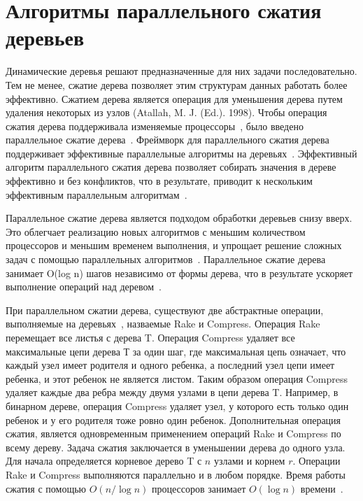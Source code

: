\documentclass[specification,annotation]{itmo-student-thesis}
\begin{document}
\section{Алгоритмы параллельного сжатия деревьев}\label{survey-contraction}

Динамические деревья решают предназначенные для них задачи последовательно. Тем не менее, сжатие дерева позволяет этим структурам данных 
работать более эффективно. Сжатием дерева является операция для уменьшения дерева путем удаления некоторых из узлов (Atallah, M. J. (Ed.). 1998). Чтобы 
операция сжатия дерева поддерживала изменяемые процессоры~\cite{miller85, miller89}, было введено параллельное сжатие дерева~\cite{miller91, reif94}. 
Фреймворк для параллельного сжатия дерева поддерживает эффективные параллельные алгоритмы на деревьях~\cite{morihata08}. Эффективный алгоритм параллельного 
сжатия дерева позволяет собирать значения в дереве эффективно и без конфликтов, что в результате, приводит к нескольким эффективным параллельным 
алгоритмам~\cite{morihata11}.

Параллельное сжатие дерева является подходом обработки деревьев снизу вверх. Это облегчает реализацию новых алгоритмов с меньшим 
количеством процессоров и меньшим временем выполнения, и упрощает решение сложных задач с помощью параллельных алгоритмов~\cite{miller85}. Параллельное 
сжатие дерева занимает O(log n) шагов независимо от формы дерева, что в результате ускоряет выполнение операций над деревом~\cite{morihata14}.

При параллельном сжатии дерева, существуют две абстрактные операции, выполняемые на деревьях~\cite{miller85}, назваемые Rake и Compress. Операция Rake 
перемещает все листья с дерева T. Операция Compress удаляет все максимальные цепи дерева Т за один шаг, где максимальная цепь означает, что каждый 
узел имеет родителя и одного ребенка, а последний узел цепи имеет ребенка, и этот ребенок не является листом. Таким образом операция Compress удаляет 
каждые два ребра между двумя узлами в цепи дерева T. Например, в бинарном дереве, операция Compress удаляет узел, у которого есть только один ребенок и 
у его родителя тоже ровно один ребенок. Дополнительная операция сжатия, является одновременным применением операций Rake и Compress по всему дереву. Задача 
сжатия заключается в уменьшении дерева до одного узла. Для начала определяется корневое дерево T с $n$ узлами и корнем $r$. Операции Rake и 
Compress выполняются параллельно и в любом порядке. Время работы сжатия с помощью $O (n/\log n)$ процессоров занимает $O(\log n)$ времени~\cite{miller85}.
\end{document}
